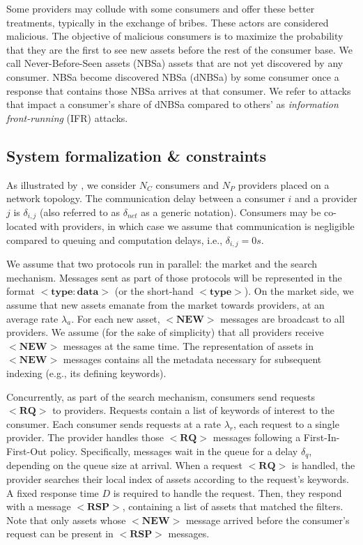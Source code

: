 Some providers may collude with some consumers and offer these better treatments, typically in the exchange of bribes.
These actors are considered malicious.
The objective of malicious consumers is to maximize the probability that they are the first to see new assets before the rest of the consumer base.
We call Never-Before-Seen assets (NBSa) assets that are not yet discovered by any consumer.
NBSa become discovered NBSa (dNBSa) by some consumer once a response that contains those NBSa arrives at that consumer.
We refer to attacks that impact a consumer's share of dNBSa compared to others' as \emph{information front-running} (IFR) attacks.

\subsection{System formalization \& constraints}

As illustrated by , we consider $N_{C}$ consumers and $N_{P}$ providers placed on a network topology.
The communication delay between a consumer $i$ and a provider $j$ is $\delta_{i,j}$ (also referred to as $\delta_{net}$ as a generic notation).
Consumers may be co-located with providers, in which case we assume that communication is negligible compared to queuing and computation delays, i.e., $\delta_{i,j}=0s$.

We assume that two protocols run in parallel: the market and the search mechanism. 
Messages sent as part of those protocols will be represented in the format $\mathbf{<type:data>}$ (or the short-hand $\mathbf{<type>}$). 
On the market side, we assume that new assets emanate from the market towards providers, at an average rate $\lambda_{a}$.
For each new asset, $\mathbf{<NEW>}$ messages are broadcast to all providers. We assume (for the sake of simplicity) that all providers receive $\mathbf{<NEW>}$ messages at the same time.
The representation of assets in $\mathbf{<NEW>}$ messages contains all the metadata necessary for subsequent indexing (e.g., its defining keywords). 

Concurrently, as part of the search mechanism, consumers send requests $\mathbf{<RQ>}$ to providers.
Requests contain a list of keywords of interest to the consumer.
Each consumer sends requests at a rate $\lambda_{r}$, each request to a single provider.
The provider handles those $\mathbf{<RQ>}$ messages following a First-In-First-Out policy. 
Specifically, messages wait in the queue for a delay $\delta_{q}$, depending on the queue size at arrival. 
When a request $\mathbf{<RQ>}$ is handled, the provider searches their local index of assets according to the request's keywords.
A fixed response time $D$ is required to handle the request. 
Then, they respond with a message $\mathbf{<RSP>}$, containing a list of assets that matched the filters. 
Note that only assets whose $\mathbf{<NEW>}$ message arrived before the consumer's request can be present in $\mathbf{<RSP>}$ messages.

